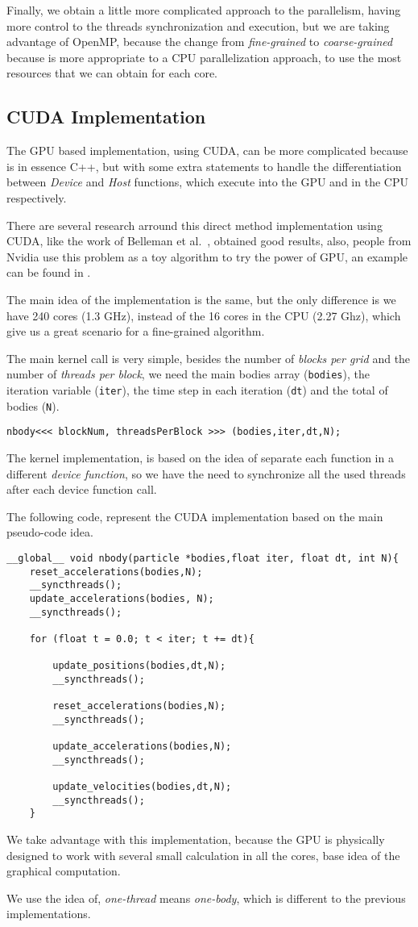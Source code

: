 Finally, we obtain a little more complicated approach to the parallelism,
having more control to the threads synchronization and execution,
but we are taking advantage of OpenMP, because the change from
\emph{fine-grained} to \emph{coarse-grained} because is more appropriate
to a CPU parallelization approach, to use the most resources that
we can obtain for each core.

\subsection{CUDA Implementation}

The GPU based implementation, using CUDA,
can be more complicated because is in essence C++,
but with some extra statements to handle the
differentiation between \emph{Device} and \emph{Host} functions,
which execute into the GPU and in the CPU respectively.

There are several research arround this direct method implementation
using CUDA, like the work of Belleman et al.~\cite{cuda1},
obtained good results, also, people from Nvidia
use this problem as a toy algorithm to try the power of GPU,
an example can be found in \cite{cuda2}.

The main idea of the implementation is the same,
but the only difference is we have 240 cores (1.3 GHz),
instead of the 16 cores in the CPU (2.27 Ghz),
which give us a great scenario for a fine-grained algorithm.

The main kernel call is very simple,
besides the number of \emph{blocks per grid}
and the number of \emph{threads per block},
we need the main bodies array (\texttt{bodies}), the iteration variable (\texttt{iter}),
the time step in each iteration (\texttt{dt}) and the total of bodies (\texttt{N}). 

\begin{lstlisting}[style=C]
 nbody<<< blockNum, threadsPerBlock >>> (bodies,iter,dt,N);
\end{lstlisting}

The kernel implementation,
is based on the idea of separate each function
in a different \emph{device function},
so we have the need to synchronize all the used
threads after each device function call.

The following code, represent the CUDA implementation
based on the main pseudo-code idea.

\begin{lstlisting}[style=C]
__global__ void nbody(particle *bodies,float iter, float dt, int N){
    reset_accelerations(bodies,N);
    __syncthreads();
    update_accelerations(bodies, N);
    __syncthreads();
    
    for (float t = 0.0; t < iter; t += dt){
    
        update_positions(bodies,dt,N);
        __syncthreads();

        reset_accelerations(bodies,N);
        __syncthreads();

        update_accelerations(bodies,N);
        __syncthreads();
    
        update_velocities(bodies,dt,N);
        __syncthreads();
    }
\end{lstlisting}

We take advantage with this implementation,
because the GPU is physically designed
to work with several small calculation
in all the cores, base idea of the graphical
computation.

We use the idea of, \emph{one-thread}
means \emph{one-body}, which is different
to the previous implementations.
